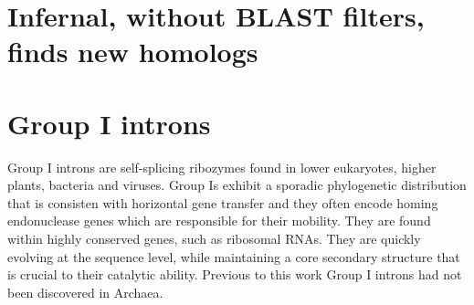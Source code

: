 \documentclass[custom,landscape,final,30pt,plainboxedsections]{sciposter-titleskipsmall}
\begin{document}
\begin{multicols}{3}

\section*{Infernal, without BLAST filters, finds new homologs}


\columnbreak


\section*{Group I introns}

\begin{flushleft}
Group I introns are self-splicing ribozymes found in lower eukaryotes,
higher plants, bacteria and viruses. Group Is exhibit a sporadic
phylogenetic distribution that is consisten with horizontal gene
transfer and they often encode homing endonuclease genes which are
responsible for their mobility. They are found within highly conserved
genes, such as ribosomal RNAs. They are quickly evolving at the
sequence level, while maintaining a core secondary structure that is
crucial to their catalytic ability. Previous to this
work\cite{Nawrocki18} Group I introns had not been discovered in
Archaea.
\end{flushleft}


\end{multicols}
\end{document}
